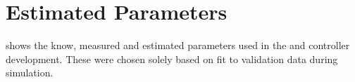%
%

\section{Estimated Parameters}\label{sec:parameterResults}
 shows the know, measured and estimated parameters used in the \abbrROV and controller development. These were chosen solely based on fit to validation data during simulation.

